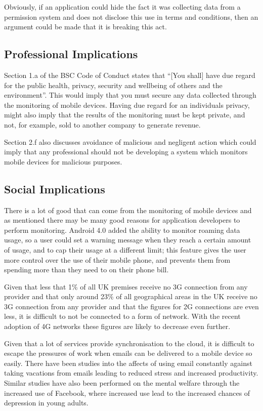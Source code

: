 \documentclass[12pt, a4paper]{article}
\begin{document}
Obviously, if an application could hide the fact it was collecting data from a
permission system and does not disclose this use in terms and conditions, then
an argument could be made that it is breaking this act.


\subsection{Professional Implications}

Section 1.a of the BSC Code of Conduct states that ``[You shall] have due regard
for the public health, privacy, security and wellbeing of others and the
environment''\cite{bsc2011conduct}. This would imply that you must secure any
data collected through the monitoring of mobile devices. Having due regard for
an individuals privacy, might also imply that the results of the monitoring must 
be kept private, and not, for example, sold to another company to generate
revenue.

Section 2.f also discusses avoidance of malicious and negligent action which
could imply that any professional should not be developing a system which
monitors mobile devices for malicious purposes.


\subsection{Social Implications}

There is a lot of good that can come from the monitoring of mobile devices and
as mentioned there may be many good reasons for application developers to
perform monitoring. Android 4.0 added the ability to monitor roaming data 
usage, so a user could set a warning message when they reach a certain amount 
of usage, and to cap their usage at a different limit\cite{android2011ics}; 
this feature gives the user more control over the use of their mobile phone, 
and prevents them from spending more than they need to on their phone bill.

Given that less that 1\% of all UK premises receive no 3G connection from any
provider and that only around 23\% of all geographical areas in the UK receive
no 3G connection from any provider\cite{offcom2013infastructure} and that the
figures for 2G connections are even less, it is difficult to not be connected
to a form of network. With the recent adoption of 4G networks these figures are
likely to decrease even further.

Given that a lot of services provide synchronisation to the cloud, it is
difficult to escape the pressures of work when emails can be delivered to a
mobile device so easily. There have been studies into the affects of using
email constantly against taking vacations from emails leading to reduced stress
and increased productivity\cite{mark2012pace}. Similar studies have also been
performed on the mental welfare through the increased use of
Facebook\cite{kross2013facebook}, where increased use lead to the increased
chances of depression in young adults.
\end{document}
